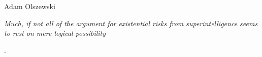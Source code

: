 \begin{artengenv}{Adam Olszewski}
	
%
%
%
%
%

\epigraph{{\footnotesize \textit{Much, if not all of the argument for existential risks from superintelligence seems to rest on mere logical possibility}}}{{\footnotesize \parencite[][]{dubhashi_ai_2017}.}\hfill \phantom{}}





\end{artengenv}
